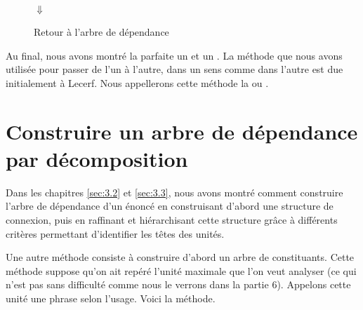 \begin{figure}
{}%
\smallskip\\
{\huge$\Downarrow$}
\medskip\\
\caption{\label{fig:laponie-lecerf}Retour à l’arbre de dépendance}
\end{figure}


Au final, nous avons montré la parfaite  un  et un . La méthode que nous avons utilisée pour passer de l’un à l’autre, dans un sens comme dans l’autre est due initialement à Lecerf. Nous appellerons cette méthode la  ou .

\section{ Construire un arbre de dépendance par décomposition}\label{sec:3.4.6}

Dans les chapitres \ref{sec:3.2} et \ref{sec:3.3}, nous avons montré comment construire l’arbre de dépendance d’un énoncé en construisant d’abord une structure de connexion, puis en raffinant et hiérarchisant cette structure grâce à différents critères permettant d’identifier les têtes des unités.

Une autre méthode consiste à construire d’abord un arbre de constituants. Cette méthode suppose qu’on ait repéré l’unité maximale que l’on veut analyser (ce qui n'est pas sans difficulté comme nous le verrons dans la partie 6). Appelons cette unité une phrase selon l’usage. Voici la méthode.

